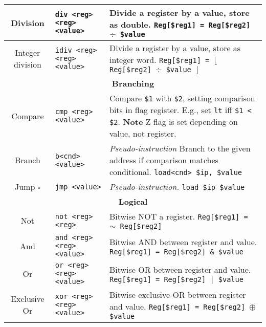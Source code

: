 \documentclass{article}
\begin{document}
\begin{longtable}{|c|l|l|}
    Division & \texttt{div <reg> <reg> <value>} & \makecell[l]{Divide a register by a value, store as double.\\%
    \texttt{Reg[\$reg1] = Reg[\$reg2] \(\div\) \$value}} \\
    \hline
    Integer division & \texttt{idiv <reg> <reg> <value>} & \makecell[l]{Divide a register by a value, store as integer word.\\%
    \texttt{Reg[\$reg1] = \(\lfloor\) Reg[\$reg2] \(\div\) \$value \(\rfloor\)}} \\
    \hline \hline
    \multicolumn{3}{|c|}{\textbf{Branching}} \\
    \hline
    Compare & \texttt{cmp <reg> <value>} & \makecell[l]{Compare \texttt{\$1} with \texttt{\$2}, setting comparison bits in flag register.\\%
    E.g., set \texttt{lt} iff \texttt{\$1 < \$2}.\\%
    \textbf{Note} Z flag is set depending on value, not register.} \\
    \hline
    Branch & \texttt{b<cnd> <value>} & \makecell[l]{\textit{Pseudo-instruction}\\%
    Branch to the given address if comparison matches conditional.\\%
    \texttt{load<cnd> \$ip, \$value}} \\
    \hline
    Jump \(\square\) & \texttt{jmp <value>} & \makecell[l]{\textit{Pseudo-instruction.}\\%
    \texttt{load \$ip \$value}} \\
    \hline \hline
    \multicolumn{3}{|c|}{\textbf{Logical}} \\
    \hline
    Not & \texttt{not <reg> <reg>} & \makecell[l]{Bitwise NOT a register.\\%
    \texttt{Reg[\$reg1] = \(\sim\) Reg[\$reg2]}} \\
    \hline
    And & \texttt{and <reg> <reg> <value>} & \makecell[l]{Bitwise AND between register and value.\\%
    \texttt{Reg[\$reg1] = Reg[\$reg2] \& \$value}} \\
    \hline
    Or & \texttt{or <reg> <reg> <value>} & \makecell[l]{Bitwise OR between register and value.\\%
    \texttt{Reg[\$reg1] = Reg[\$reg2] | \$value}} \\
    \hline
    Exclusive Or & \texttt{xor <reg> <reg> <value>} & \makecell[l]{Bitwise exclusive-OR between register and value.\\%
    \texttt{Reg[\$reg1] = Reg[\$reg2] \(\oplus\) \$value}} \\

\end{longtable}
\end{document}
